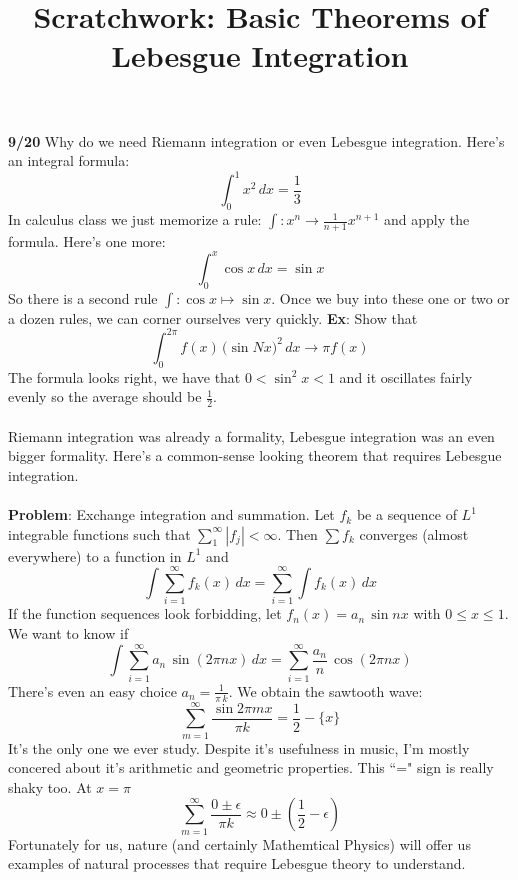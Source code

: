 \documentclass[12pt]{article}
\title{Scratchwork: Basic Theorems of Lebesgue Integration}
\date{}
\begin{document}
\sffamily

\maketitle

\noindent \textbf{9/20} Why do we need Riemann integration or even Lebesgue integration.  Here's an integral formula:
$$ \int_0^1 x^2 \, dx = \frac{1}{3}$$
In calculus class we just memorize a rule: $\int: x^n \to \frac{1}{n+1}x^{n+1}$ and apply the formula.  Here's one more:
$$ \int_0^{x} \cos x \, dx = \sin x $$
So there is a second rule $\int: \cos x \mapsto \sin x$. Once we buy into these one or two or a dozen rules, we can corner ourselves very quickly.  \textbf{Ex}: Show that 
$$ \int_0^{2\pi} f(x) \, \big( \sin Nx \big)^2 \, dx \to \pi f(x) $$
The formula looks right, we have that $0 < \sin^2 x < 1$ and it oscillates fairly evenly so the average should be $\frac{1}{2}$. \\ \\
Riemann integration was already a formality, Lebesgue integration was an even bigger formality. Here's a common-sense looking theorem that requires Lebesgue integration. \\ \\
\textbf{Problem}: Exchange integration and summation.  Let $f_k$ be a sequence of $L^1$ integrable functions such that $\sum_1^\infty |f_j| < \infty$.  Then $\sum f_k$ converges (almost everywhere) to a function in $L^1$ and 
$$ \int \sum_{i=1}^\infty f_k (x) \, dx = \sum_{i=1}^\infty \int f_k (x) \, dx $$
If the function sequences look forbidding, let $f_n(x) = a_n \, \sin n x$ with $0 \leq x \leq 1$. We want to know if
$$ \int \sum_{i=1}^\infty a_n \, \sin (2\pi n x) \, dx = \sum_{i=1}^\infty \frac{a_n}{n} \, \cos(2\pi n x)  $$
There's even an easy choice $a_n = \frac{1}{\pi \, k}$. We obtain the sawtooth wave:
$$  \sum_{m=1}^\infty \frac{\sin 2\pi m x}{\pi k } = \frac{1}{2} - \{ x\} $$
It's the only one we ever study.  Despite it's usefulness in music, I'm mostly concered about it's arithmetic and geometric properties.  This ``=" sign is really shaky too.  At $x = \pi$ 
$$  \sum_{m=1}^\infty \frac{0 \pm \epsilon }{\pi k } \approx 0 \pm \left(\frac{1}{2} - \epsilon \right) $$
Fortunately for us, nature (and certainly Mathemtical Physics) will offer us examples of natural processes that require Lebesgue theory to understand.

\newpage
\end{document}
